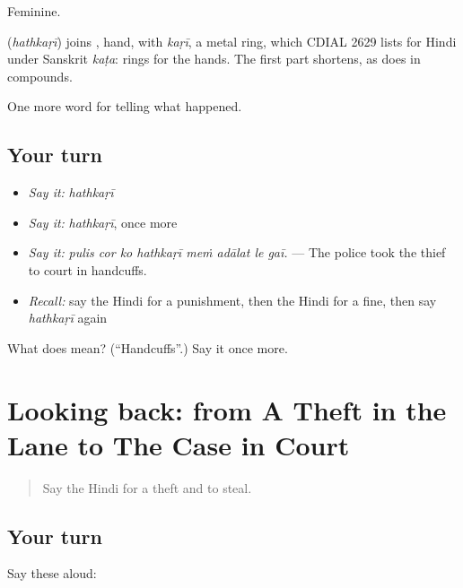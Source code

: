 Feminine.

\begin{cousinweb}
\textbf{} (\emph{hathkaṛī}) joins \textbf{}, hand, with \emph{kaṛī}, a metal ring, which CDIAL 2629 lists for Hindi under Sanskrit \emph{kaṭa}: rings for the hands. The first part shortens, as \textbf{} does in compounds.
\end{cousinweb}

\begin{grammarlens}[title={What you've built}]
One more word for telling what happened.
\end{grammarlens}

\subsection*{Your turn}
\begin{itemize}
\raggedright
  \item \emph{Say it:} \emph{hathkaṛī}
  \item \emph{Say it:} \emph{hathkaṛī}, once more
  \item \emph{Say it:} \emph{pulis cor ko hathkaṛī meṁ adālat le gaī.} — The police took the thief to court in handcuffs.
  \item \emph{Recall:} say the Hindi for a punishment, then the Hindi for a fine, then say \emph{hathkaṛī} again
\end{itemize}

\begin{tcolorbox}[breakable,colback=teal!4,colframe=teal!35!black,title={Before you move on}]
What does  mean? (\textquotedblleft{}Handcuffs\textquotedblright{}.) Say it once more.
\end{tcolorbox}
\section[(dialogue)]{Looking back: from A Theft in the Lane to The Case in Court}

\label{lesson:HI-R295-review-288-295}



\begin{quote}
Say the Hindi for a theft and to steal.
\end{quote}

\subsection*{Your turn}
Say these aloud:

